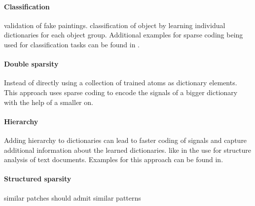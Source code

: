 
\paragraph{Classification} \cite{?} validation of fake paintings. 
\cite{?} classification of object by learning individual dictionaries for each
object group. Additional examples for sparse coding  being used for
classification tasks can be found in
\cite{Raina2007,BradleyBagnel2009,Mairal2008,Mairal2008b,Bar2009,Yang2009}.



\paragraph{Double sparsity}
Instead of directly using a collection of trained atoms as dictionary
elements. This approach uses sparse coding to encode the signals of a bigger
dictionary with the help of a smaller on.\cite{Rubinstein2009} 


\paragraph{Hierarchy}
Adding hierarchy to dictionaries can lead to faster coding of signals and
capture additional information about the learned dictionaries. like in the use
for structure analysis of text documents. Examples for this approach can be
found in\cite{Jenatton2010}.


\paragraph{Structured sparsity}
similar patches should admit similar patterns \cite{Mairal2009} 
\cite{group sparsity}




